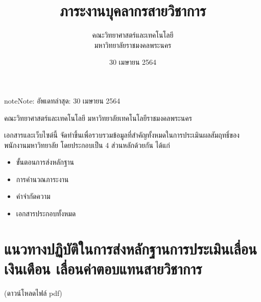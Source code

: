 \documentclass[a4paper,12pt,english]{sphinxmanual}
\title{ภาระงานบุคลากรสายวิชาการ}
\date{30 เมษายน 2564}
\author{คณะวิทยาศาสตร์และเทคโนโลยี \\  มหาวิทยาลัยราชมงคลพระนคร}
\begin{document}
\pagestyle{empty}
\sphinxmaketitle
\pagestyle{plain}
\sphinxtableofcontents
\pagestyle{normal}
\label{\detokenize{index::doc}}
\begin{sphinxadmonition}{note}{Note:}
อัพเดทล่าสุด: 30 เมษายน 2564
\end{sphinxadmonition}



คณะวิทยาศาสตร์และเทคโนโลยี มหาวิทยาลัยเทคโนโลยีราชมงคลพระนคร

เอกสารและเว็บไซต์นี้ จัดทำขึ้นเพื่อรวบรวมข้อมูลที่สำคัญทั้งหมดในการประเมินผลสัมฤทธิ์ของพนักงานมหาวิทยาลัย โดยประกอบเป็น 4 ส่วนหลักด้วยกัน ได้แก่
\begin{itemize}
\item {} 
ขั้นตอนการส่งหลักฐาน

\item {} 
การคำนวณภาระงาน

\item {} 
คำจำกัดความ

\item {} 
เอกสารประกอบทั้งหมด

\end{itemize}


\chapter{แนวทางปฏิบัติในการส่งหลักฐานการประเมินเลื่อนเงินเดือน เลื่อนค่าตอบแทนสายวิชาการ}
\label{\detokenize{howtosubmit:id1}}\label{\detokenize{howtosubmit::doc}}
 (ดาวน์โหลดไฟล์ pdf)

\noindent{}

\noindent{}

\noindent{}

\noindent{}

\noindent{}

\noindent{}

\noindent{}
\end{document}
